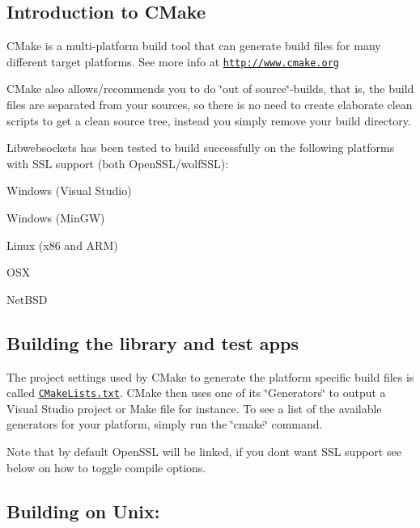 \subsection*{Introduction to C\+Make }

C\+Make is a multi-\/platform build tool that can generate build files for many different target platforms. See more info at \href{http://www.cmake.org}{\tt http\+://www.\+cmake.\+org}

C\+Make also allows/recommends you to do \char`\"{}out of source\char`\"{}-\/builds, that is, the build files are separated from your sources, so there is no need to create elaborate clean scripts to get a clean source tree, instead you simply remove your build directory.

Libwebsockets has been tested to build successfully on the following platforms with S\+SL support (both Open\+S\+S\+L/wolf\+S\+SL)\+:


\begin{DoxyItemize}
\item Windows (Visual Studio)
\item Windows (Min\+GW)
\item Linux (x86 and A\+RM)
\item O\+SX
\item Net\+B\+SD
\end{DoxyItemize}

\subsection*{Building the library and test apps }

The project settings used by C\+Make to generate the platform specific build files is called \href{CMakeLists.txt}{\tt C\+Make\+Lists.\+txt}. C\+Make then uses one of its \char`\"{}\+Generators\char`\"{} to output a Visual Studio project or Make file for instance. To see a list of the available generators for your platform, simply run the \char`\"{}cmake\char`\"{} command.

Note that by default Open\+S\+SL will be linked, if you don\textquotesingle{}t want S\+SL support see below on how to toggle compile options.

\subsection*{Building on Unix\+: }


